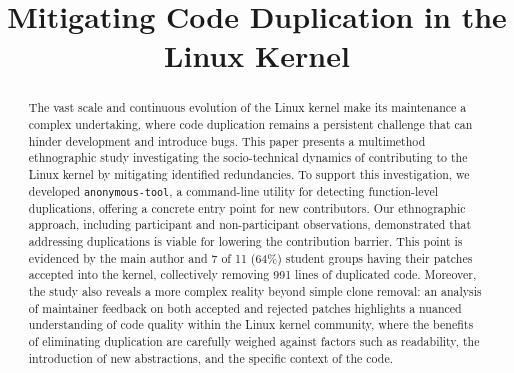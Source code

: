 \documentclass[10pt,conference]{IEEEtran}
\begin{document}
\title{Mitigating Code Duplication in the Linux Kernel}



\author{}


\maketitle

\begin{abstract}
The vast scale and continuous evolution of the Linux kernel make its maintenance a complex undertaking, where code duplication remains a persistent challenge that can hinder development and introduce bugs. This paper presents a multimethod ethnographic study investigating the socio-technical dynamics of contributing to the Linux kernel by mitigating identified redundancies. To support this investigation, we developed \texttt{anonymous-tool}, a command-line utility for detecting function-level duplications, offering a concrete entry point for new contributors. Our ethnographic approach, including participant and non-participant observations, demonstrated that addressing duplications is viable for lowering the contribution barrier. This point is evidenced by the main author and 7 of 11 (64\%) student groups having their patches accepted into the kernel, collectively removing 991 lines of duplicated code. Moreover, the study also reveals a more complex reality beyond simple clone removal: an analysis of maintainer feedback on both accepted and rejected patches highlights a nuanced understanding of code quality within the Linux kernel community, where the benefits of eliminating duplication are carefully weighed against factors such as readability, the introduction of new abstractions, and the specific context of the code.
\end{abstract}

\end{document}
